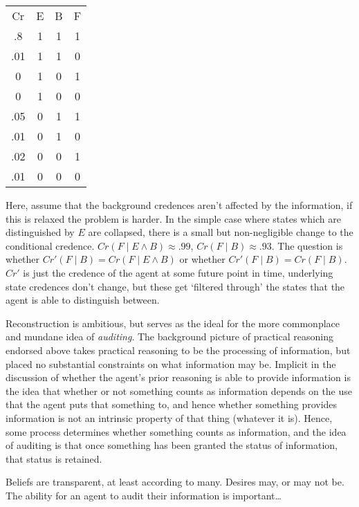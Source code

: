 \documentclass[10pt]{article}
\begin{document}
  \begin{table}[h]
    \centering
    \begin{tabularx}{1.0\linewidth}[h]{cccc}
      Cr & E & B & F \\
      .8 & 1 & 1 & 1 \\
      .01 & 1 & 1 & 0 \\
      0 & 1 & 0 & 1 \\
      0 & 1 & 0 & 0 \\
      .05 & 0 & 1 & 1 \\
      .01 & 0 & 1 & 0 \\
      .02 & 0 & 0 & 1 \\
      .01 & 0 & 0 & 0 \\
    \end{tabularx}
  \end{table}
Here, assume that the background credences aren't affected by the information, if this is relaxed the problem is harder.
In the simple case where states which are distinguished by \(E\) are collapsed, there is a small but non-negligible change to the conditional credence.
\(Cr(F \mid E \land B) \approx .99\), \(Cr(F \mid B) \approx .93\).
The question is whether \(Cr'(F \mid B) = Cr(F \mid E \land B)\) or whether \(Cr'(F \mid B) = Cr(F \mid B)\).
\(Cr'\) is just the credence of the agent at some future point in time, underlying state credences don't change, but these get `filtered through' the states that the agent is able to distinguish between.

Reconstruction is ambitious, but serves as the ideal for the more commonplace and mundane idea of \emph{auditing}.
The background picture of practical reasoning endorsed above takes practical reasoning to be the processing of information, but placed no substantial constraints on what information may be.
Implicit in the discussion of whether the agent's prior reasoning is able to provide information is the idea that whether or not something counts as information depends on the use that the agent puts that something to, and hence whether something provides information is not an intrinsic property of that thing (whatever it is).
Hence, some process determines whether something counts as information, and the idea of auditing is that once something has been granted the status of information, that status is retained.








Beliefs are transparent, at least according to many.
Desires may, or may not be.
The ability for an agent to audit their information is important\dots
\end{document}

